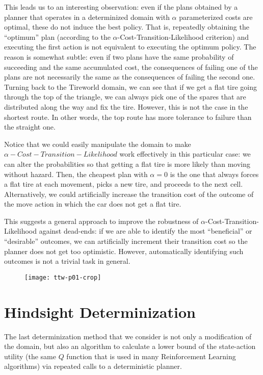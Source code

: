 \documentclass[../root.tex]{subfiles}
\begin{document}
This leads us to an interesting observation: even if the plans obtained
by a planner that operates in a determinized domain with $\alpha$ parameterized
costs are optimal, these do not induce the best policy. That is, repeatedly obtaining
the ``optimum'' plan (according to the $\alpha$-Cost-Transition-Likelihood criterion)
and executing the first action is not equivalent to executing
the optimum policy. The reason is somewhat subtle: even if two plans have the same
probability of succeeding and the same accumulated cost, the consequences of failing
one of the plans are not necessarily the same as the consequences of failing the second
one. Turning back to the Tireworld domain, we can see that if we get a flat tire going
through the top of the triangle, we can always pick one of the spares that are
distributed along the way and fix the tire. However, this is not the case in the
shortest route. In other words, the top route has more tolerance to failure than the
straight one.

Notice that we could easily manipulate the domain to make $\alpha-Cost-Transition-Likelihood$
work effectively in this particular case: we can alter the probabilities so that getting a
flat tire is more likely
than moving without hazard. Then, the cheapest plan with $\alpha = 0$ is the one that
always forces a flat tire at each movement, picks a new tire, and proceeds to the next
cell. Alternatively, we could artificially increase the transition cost of the outcome
of the move action in which the car does not get a flat tire.

This suggests a general approach to improve the robustness of $\alpha$-Cost-Transition-Likelihood
against dead-ends: if we are able to identify the most ``beneficial'' or ``desirable''
outcomes, we can artificially increment their transition cost so the planner does not get too
optimistic. However, automatically identifying such outcomes is not a trivial task in general.


\begin{figure}[tbp]
	\centering
	\texttt{[image: ttw-p01-crop]}
	\caption{}
	\label{fig:ttwmap}
\end{figure}

\section{Hindsight Determinization}

The last determinization method that we consider is not only a modification of the domain,
but also an algorithm to calculate a lower bound of the state-action utility (the same $ Q $
function that is used in many Reinforcement Learning algorithms) via repeated calls
to a deterministic planner.
\end{document}
